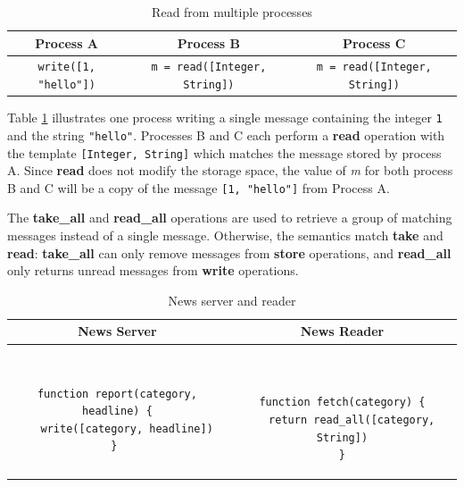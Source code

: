 \documentclass[lnicst]{svmultln}
\begin{document}
\begin{table}
\centering
\caption{Read from multiple processes}
\begin{tabular}{|c|c|c|} \hline
\textbf{Process A} & \textbf{Process B} & \textbf{Process C} \\ \hline
\texttt{write([1, "hello"])} & \texttt{m = read([Integer, String])} & \texttt{m = read([Integer, String])} \\ \hline
\end{tabular}
\label{fig:readprocesses}
\end{table}

Table \ref{fig:readprocesses} illustrates one process writing a single message containing the integer \texttt{1} and the string \texttt{"hello"}. Processes B and C each perform a \textbf{read} operation with the template \texttt{[Integer, String]} which matches the message stored by process A. Since \textbf{read} does not modify the storage space, the value of \textit{m} for both process B and C will be a copy of the message \texttt{[1, "hello"]} from Process A.

The \textbf{take\_all} and \textbf{read\_all} operations are used to retrieve a group of matching messages instead of a single message. Otherwise, the semantics match \textbf{take} and \textbf{read}: \textbf{take\_all} can only remove messages from \textbf{store} operations, and \textbf{read\_all} only returns unread messages from \textbf{write} operations.

\begin{table}
\centering
\caption{News server and reader}
\begin{tabular}{|c|c|} \hline
\textbf{News Server} & \textbf{News Reader} \\ \hline
\begin{minipage}{2.45in}
\begin{verbatim}

function report(category, headline) {
   write([category, headline])
} 
\end{verbatim}
\end{minipage}
&
\begin{minipage}{2.5in}
\begin{verbatim}


function fetch(category) {
   return read_all([category, String])
}
\end{verbatim}
\end{minipage}
\\ \hline
\end{tabular}
\label{fig:newsreader}
\end{table}
\end{document}
